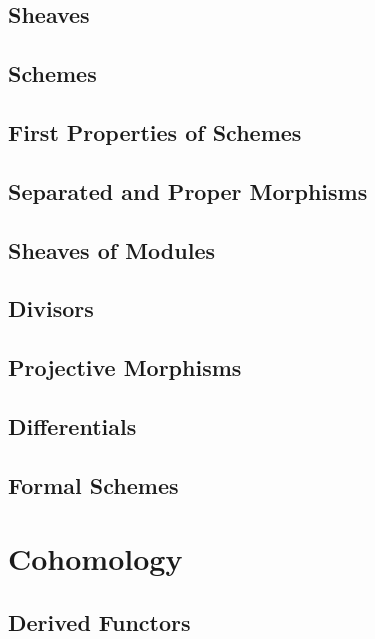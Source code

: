 \documentclass[11pt, a4paper]{article}
\begin{document}
\subsection{Sheaves}

\subsection{Schemes}

\subsection{First Properties of Schemes}

\subsection{Separated and Proper Morphisms}

\subsection{Sheaves of Modules}

\subsection{Divisors}

\subsection{Projective Morphisms}

\subsection{Differentials}

\subsection{Formal Schemes}

\section{Cohomology}

\subsection{Derived Functors}
\end{document}
